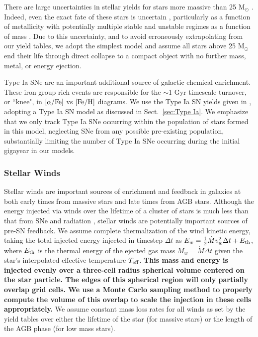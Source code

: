 \documentclass[fleqn,usenatbib,useAMS]{mnras}
\begin{document}
There are large uncertainties in stellar yields for stars more massive than 25 M$_{\odot}$ \citep[see ][and references therein]{Cote2016}. Indeed, even the exact fate of these stars is uncertain \citep[e.g.][]{Woosley2002,Zhang2008,Ugliano2012}, particularly as a function of metallicity \citep{Fryer2012} with potentially multiple stable and unstable regimes as a function of mass \citep{Heger2003}. Due to this uncertainty, and to avoid erroneously extrapolating from our yield tables, we adopt the simplest model and assume all stars above 25 M$_{\odot}$ end their life through direct collapse to a compact object with no further mass, metal, or energy ejection.

Type Ia SNe are an important additional source of galactic chemical enrichment. These iron group rich events are responsible for the $\sim$1 Gyr timescale turnover, or ``knee", in $[\alpha/\rm{Fe}]$ vs $[\rm{Fe}/\rm{H}]$ diagrams. We use the Type Ia SN yields given in \citet{Thielemann1986}, adopting a Type Ia SN model as discussed in Sect.~\ref{sec:Type Ia}. We emphasize that we only track Type Ia SNe occurring within the population of stars formed in this model, neglecting SNe from any possible pre-existing population, substantially limiting the number of Type Ia SNe occurring during the initial gigayear in our models.

\subsubsection{Stellar Winds}
\label{sec:stellar winds}
Stellar winds are important sources of enrichment and feedback in galaxies at both early times from massive stars and late times from AGB stars. Although the energy injected via winds over the lifetime of a cluster of stars is much less than that from SNe and radiation \citep{Shull1995}, stellar winds are potentially important sources of pre-SN feedback. We assume complete thermalization of the wind kinetic energy, taking the total injected energy injected in timestep $\Delta t$ as $E_w = \frac{1}{2}\dot{M}  v^2_w\Delta t  + E_{\rm th}$, where $E_{\rm th}$ is the thermal energy of the ejected gas mass $M_w = \dot{M}\Delta t$ given the star's interpolated effective temperature $T_{\rm eff}$. \textbf{This mass and energy is injected evenly over a three-cell radius spherical volume centered on the star particle. The edges of this spherical region will only partially overlap grid cells. We use a Monte Carlo sampling method to properly compute the volume of this overlap to scale the injection in these cells appropriately.} We assume constant mass loss rates for all winds as set by the yield tables over either the lifetime of the star (for massive stars) or the length of the AGB phase (for low mass stars). 
\end{document}
